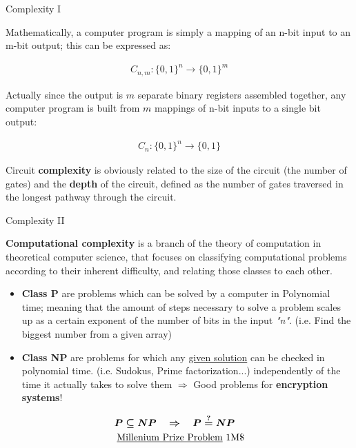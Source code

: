 \documentclass[9pt, handout, aspectratio=169]{beamer}	%
\begin{document}
	\begin{frame}{Complexity I}

		Mathematically, a computer program is simply a mapping of an n-bit input to an m-bit output; this can be expressed as:

		\begin{align*}
			C_{n,m}:\lbrace 0,1 \rbrace^n \rightarrow \lbrace 0,1 \rbrace^m
		\end{align*}

		Actually since the output is $m$ separate binary registers assembled together, any computer program is built from $m$ mappings of n-bit inputs to a single bit output:

		\begin{align*}
			C_{n}:\lbrace 0,1 \rbrace^n \rightarrow \lbrace 0,1 \rbrace
		\end{align*}

		\pause

		Circuit \textbf{complexity} is obviously related to the size of the circuit (the number of gates) and the \textbf{depth} of the circuit, defined as the number of gates traversed in the longest pathway through the circuit.

	\end{frame}

	\begin{frame}{Complexity II}

		\textbf{Computational complexity} is a branch of the theory of computation in theoretical computer science, that focuses on classifying computational problems according to their inherent difficulty, and relating those classes to each other. \pause

		\begin{itemize}
			\item \textbf{Class P} are problems which can be solved by a computer in Polynomial time; meaning that the amount of steps necessary to solve a problem scales up as a certain exponent of the number of bits in the input \emph{"n"}. (i.e. Find the biggest number from a given array) \pause
			\item \textbf{Class NP} are problems for which any \underline{given solution} can be checked in polynomial time. (i.e. Sudokus, Prime factorization...) independently of the time it actually takes to solve them $\Rightarrow$ Good problems for \textbf{encryption systems}!
		\end{itemize}

		\pause

		\vspace{-8pt}
		\begin{align*}
			\boldsymbol{P \subseteq NP \quad \Rightarrow \quad P \overset{?}{=} NP \quad } \\
			\text{\underline{Millenium Prize Problem} 1M\$}
		\end{align*}
		\vspace{-20pt}

	\end{frame}
\end{document}
